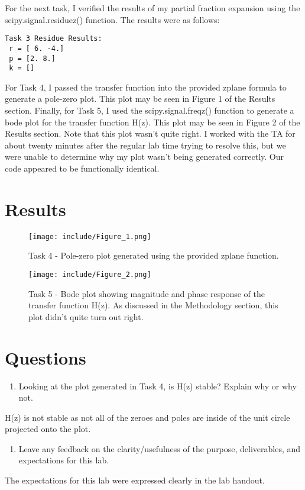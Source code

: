 \documentclass[12pt]{article}
\begin{document}
For the next task, I verified the results of my partial fraction expansion using the scipy.signal.residuez() function. The results were as follows:

\begin{verbatim}
Task 3 Residue Results:
 r = [ 6. -4.]
 p = [2. 8.]
 k = []
\end{verbatim}

For Task 4, I passed the transfer function into the provided zplane formula to generate a pole-zero plot. This plot may be seen in Figure 1 of the Results section. Finally, for Task 5, I used the scipy.signal.freqz() function to generate a bode plot for the transfer function H(z). This plot may be seen in Figure 2 of the Results section. Note that this plot wasn't quite right. I worked with the TA for about twenty minutes after the regular lab time trying to resolve this, but we were unable to determine why my plot wasn't being generated correctly. Our code appeared to be functionally identical.

\newpage
\section*{Results}

\begin{figure}[H]
\centering
\texttt{[image: include/Figure\_1.png]}
\caption{Task 4 - Pole-zero plot generated using the provided zplane function.}
\end{figure}

\begin{figure}[H]
\centering
\texttt{[image: include/Figure\_2.png]}
\caption{Task 5 - Bode plot showing magnitude and phase response of the transfer function H(z). As discussed in the Methodology section, this plot didn't quite turn out right.}
\end{figure}

\newpage
\section*{Questions}

\begin{enumerate}
    \item Looking at the plot generated in Task 4, is H(z) stable? Explain why or why not.
\end{enumerate}
    \par H(z) is not stable as not all of the zeroes and poles are inside of the unit circle projected onto the plot.
    
\begin{enumerate}[resume]
    \item Leave any feedback on the clarity/usefulness of the purpose, deliverables, and expectations for this lab.
\end{enumerate}
    \par The expectations for this lab were expressed clearly in the lab handout.
\end{document}
